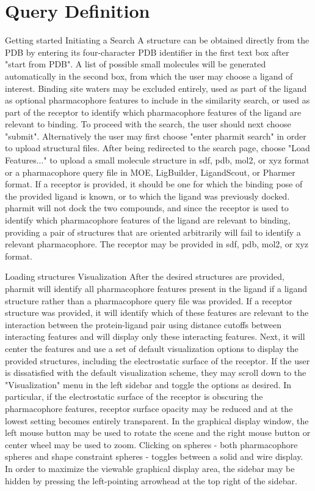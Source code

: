 \section{Query Definition}


Getting started
Initiating a Search
A structure can be obtained directly from the PDB by entering its four-character PDB identifier in the first text box after "start from PDB". A list of possible small molecules will be generated automatically in the second box, from which the user may choose a ligand of interest. Binding site waters may be excluded entirely, used as part of the ligand as optional pharmacophore features to include in the similarity search, or used as part of the receptor to identify which pharmacophore features of the ligand are relevant to binding. To proceed with the search, the user should next choose "submit". 
Alternatively the user may first choose "enter pharmit search" in order to upload structural files. After being redirected to the search page, choose "Load Features..." to upload a small molecule structure in sdf, pdb, mol2, or xyz format or a pharmacophore query file in MOE, LigBuilder, LigandScout, or Pharmer format. If a receptor is provided, it should be one for which the binding pose of the provided ligand is known, or to which the ligand was previously docked. pharmit will not dock the two compounds, and since the receptor is used to identify which pharmacophore features of the ligand are relevant to binding, providing a pair of structures that are oriented arbitrarily will fail to identify a relevant pharmacophore. The receptor may be provided in sdf, pdb, mol2, or xyz format.


Loading structures
Visualization
After the desired structures are provided, pharmit will identify all pharmacophore features present in the ligand if a ligand structure rather than a pharmacophore query file was provided. If a receptor structure was provided, it will identify which of these features are relevant to the interaction between the protein-ligand pair using distance cutoffs between interacting features and will display only these interacting features. Next, it will center the features and use a set of default visualization options to display the provided structures, including the electrostatic surface of the receptor. If the user is dissatisfied with the default visualization scheme, they may scroll down to the "Visualization" menu in the left sidebar and toggle the options as desired. In particular, if the electrostatic surface of the receptor is obscuring the pharmacophore features, receptor surface opacity may be reduced and at the lowest setting becomes entirely transparent. In the graphical display window, the left mouse button may be used to rotate the scene and the right mouse button or center wheel may be used to zoom. Clicking on spheres - both pharmacophore spheres and shape constraint spheres - toggles between a solid and wire display. In order to maximize the viewable graphical display area, the sidebar may be hidden by pressing the left-pointing arrowhead at the top right of the sidebar.


